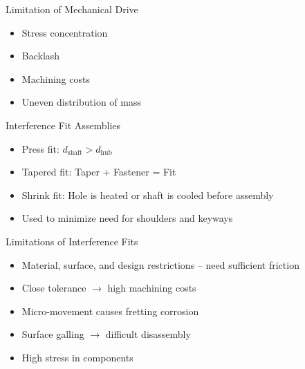 \documentclass[10pt, svgnames]{beamer}
\begin{document}
\begin{frame}[label={sec:org053e2dc}]{Limitation of Mechanical Drive}
\begin{itemize}
\item Stress concentration
\item Backlash
\item Machining costs
\item Uneven distribution of mass
\end{itemize}
\end{frame}

\begin{frame}[label={sec:org4aa2a2b}]{Interference Fit Assemblies}
\begin{itemize}
\item Press fit: \(d_{\text{shaft}} > d_{\text{hub}}\)
\item Tapered fit: Taper + Fastener = Fit
\item Shrink fit: Hole is heated or shaft is cooled before assembly
\item Used to minimize need for shoulders and keyways
\end{itemize}
\end{frame}

\begin{frame}[label={sec:org0958ef7}]{Limitations of Interference Fits}
\begin{itemize}
\item Material, surface, and design restrictions -- need sufficient friction
\item Close tolerance \(\rightarrow\) high machining costs
\item Micro-movement causes fretting corrosion
\item Surface galling \(\rightarrow\) difficult disassembly
\item High stress in components
\end{itemize}
\end{frame}
\end{document}

